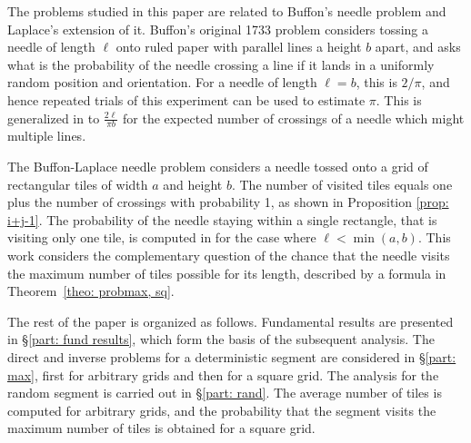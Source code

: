\documentclass[12pt, a4paper]{article}
\newcommand{\len}{\ell} %
\begin{document}

The problems studied in this paper are related to Buffon's needle problem and Laplace's extension of it. Buffon's original 1733 problem considers tossing a needle of length $\len$ onto ruled paper with parallel lines a height $b$ apart, and asks what is the probability of the needle crossing a line if it lands in a uniformly random position and orientation. For a needle of length $\len = b$, this is $2/\pi$, and hence repeated trials of this experiment can be used to estimate $\pi$. This is generalized in \cite{Ramaley69} to $\frac{2\len}{\pi b}$ for the expected number of crossings of a needle which might multiple lines.

The Buffon-Laplace needle problem considers a needle tossed onto a grid of rectangular tiles of width $a$ and height $b$. The number of visited tiles equals one plus the number of crossings with probability 1, as shown in Proposition \ref{prop: 
i+j-1}. The probability of the needle staying within a single rectangle, that is visiting only one tile, is computed in \cite{Arnow94} for the case where $\len < \min(a,b)$. This work considers the complementary question of the chance that the needle visits the maximum number of tiles possible for its length, described by a formula in Theorem~\ref{theo: probmax, sq}.


The rest of the paper is organized as follows. Fundamental results are presented in \S\ref{part: fund results}, which form the basis of the subsequent analysis. The direct and inverse problems for a deterministic segment are considered in \S\ref{part: max}, first for arbitrary grids and then for a square grid. The analysis for the random segment is carried out in \S\ref{part: rand}. The average number of tiles is computed for arbitrary grids, and the probability that the segment visits the maximum number of tiles is obtained for a square grid.

\end{document}
